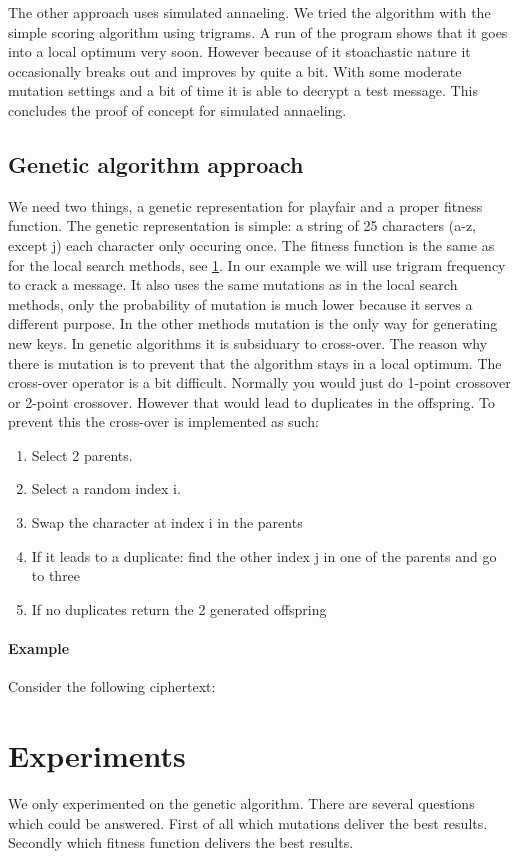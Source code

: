 \documentclass[]{article}
\begin{document}
The other approach uses simulated annaeling. We tried the algorithm with the simple scoring algorithm using trigrams. A run of the program shows that it goes into a local optimum very soon. However because of it stoachastic nature it occasionally breaks out and improves by quite a bit. With some moderate mutation settings and a bit of time it is able to decrypt a test message. This concludes the proof of concept for simulated annaeling.
\subsection{Genetic algorithm approach}
We need two things, a genetic representation for playfair and a proper fitness function. The genetic representation is simple: a string of 25 characters (a-z, except j) each character only occuring once. 
The fitness function is the same as for the local search methods, see \ref{}. In our example we will use trigram frequency to crack a message. It also uses the same mutations as in the local search methods, only the probability of mutation is much lower because it serves a different purpose. In the other methods mutation is the only way for generating new keys. In genetic algorithms it is subsiduary to cross-over. The reason why there is mutation is to prevent that the algorithm stays in a local optimum. The cross-over operator is a bit difficult. Normally you would just do 1-point crossover or 2-point crossover. However that would lead to duplicates in the offspring. To prevent this the cross-over is implemented as such:
\begin{enumerate}
	\item Select 2 parents.
	\item Select a random index i.
	\item Swap the character at index i in the parents
	\item If it leads to a duplicate: find the other index j in one of the parents and go to three
	\item If no duplicates return the 2 generated offspring
\end{enumerate}
\paragraph{Example}
Consider the following ciphertext:

\section{Experiments}
We only experimented on the genetic algorithm. There are several questions which could be answered.
First of all which mutations deliver the best results. Secondly which fitness function delivers the best results. 
\end{document}
